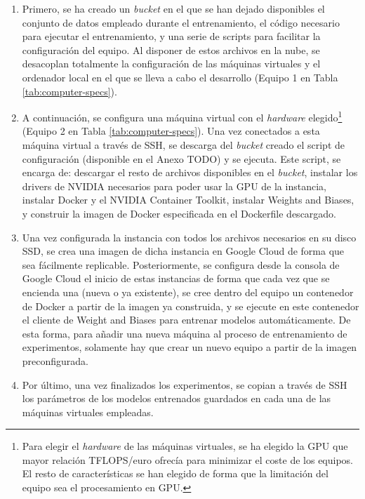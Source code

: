 \begin{enumerate}
\item Primero, se ha creado un \textit{bucket} en el que se han dejado disponibles el conjunto de datos empleado durante el entrenamiento, el código necesario para ejecutar el entrenamiento, y una serie de scripts para facilitar la configuración del equipo. Al disponer de estos archivos en la nube, se desacoplan totalmente la configuración de las máquinas virtuales y el ordenador local en el que se lleva a cabo el desarrollo (Equipo 1 en Tabla \ref{tab:computer-specs}).
\item A continuación, se configura una máquina virtual con el \textit{hardware} elegido\footnote{Para elegir el \textit{hardware} de las máquinas virtuales, se ha elegido la GPU que mayor relación TFLOPS/euro ofrecía para minimizar el coste de los equipos. El resto de características se han elegido de forma que la limitación del equipo sea el procesamiento en GPU.} (Equipo 2 en Tabla \ref{tab:computer-specs}). Una vez conectados a esta máquina virtual a través de SSH, se descarga del \textit{bucket} creado el script de configuración (disponible en el Anexo TODO) y se ejecuta. Este script, se encarga de: descargar el resto de archivos disponibles en el \textit{bucket}, instalar los drivers de NVIDIA necesarios para poder usar la GPU de la instancia, instalar Docker y el NVIDIA Container Toolkit, instalar Weights and Biases, y construir la imagen de Docker especificada en el Dockerfile descargado.
\item Una vez configurada la instancia con todos los archivos necesarios en su disco SSD, se crea una imagen de dicha instancia en Google Cloud de forma que sea fácilmente replicable. Posteriormente, se configura desde la consola de Google Cloud el inicio de estas instancias de forma que cada vez que se encienda una (nueva o ya existente), se cree dentro del equipo un contenedor de Docker a partir de la imagen ya construida, y se ejecute en este contenedor el cliente de Weight and Biases para entrenar modelos automáticamente. De esta forma, para añadir una nueva máquina al proceso de entrenamiento de experimentos, solamente hay que crear un nuevo equipo a partir de la imagen preconfigurada.
\item Por último, una vez finalizados los experimentos, se copian a través de SSH los parámetros de los modelos entrenados guardados en cada una de las máquinas virtuales empleadas.
\end{enumerate}

